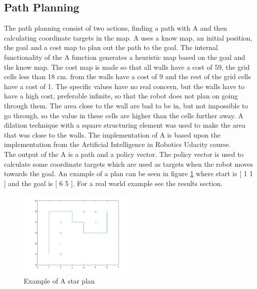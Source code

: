 \subsection{Path Planning}
The path planning consist of two actions, finding a path with A\text{*} and then calculating coordinate targets in the map. 
A\text{*} uses a know map, an initial position, the goal and a cost map to plan out the path to the goal. 
The internal functionality of the A\text{*} function generates a heuristic map based on the goal and the know map.
The cost map is made so that all walls have a cost of 59, the grid cells less than 18 cm. from the walls have a cost of 9 and the rest of the grid cells have a cost of 1. The specific values have no real concern, but the walls have to have a high cost, preferable infinite, so that the robot does not plan on going through them. The area close to the wall are bad to be in, but not impossible to go through, so the value in these cells are higher than the cells further away. A dilation technique with a square structuring element was used to make the area that was close to the walls.
The implementation of A\text{*} is based upon the implementation from the Artificial Intelligence in Robotics Udacity course\citep{AIROK}.\\
The output of the A\text{*} is a path and a policy vector. The policy vector is used to calculate some coordinate targets which are used as targets when the robot moves towards the goal. An example of a plan can be seen in figure \ref{fig:exastar} where start is [ 1 1 ] and the goal is [ 6 5 ]. For a real world example see the results section.
\begin{figure}[H]
\centering
\includegraphics[width=0.5\textwidth]{billeder/exampleastar}
\caption{Example of A star plan}
\label{fig:exastar}
\end{figure}